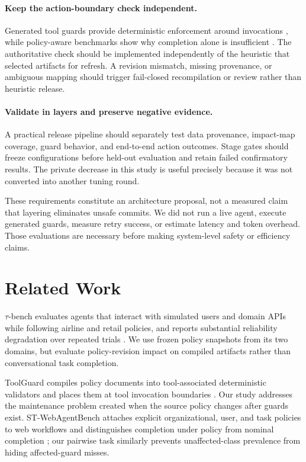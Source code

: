 \documentclass{article}
\begin{document}
\paragraph{Keep the action-boundary check independent.} Generated tool guards provide deterministic enforcement around invocations \cite{zwerdling2025toolguard}, while policy-aware benchmarks show why completion alone is insufficient \cite{levy2026stwebagentbench}. The authoritative check should be implemented independently of the heuristic that selected artifacts for refresh. A revision mismatch, missing provenance, or ambiguous mapping should trigger fail-closed recompilation or review rather than heuristic release.

\paragraph{Validate in layers and preserve negative evidence.} A practical release pipeline should separately test data provenance, impact-map coverage, guard behavior, and end-to-end action outcomes. Stage gates should freeze configurations before held-out evaluation and retain failed confirmatory results. The private decrease in this study is useful precisely because it was not converted into another tuning round.

These requirements constitute an architecture proposal, not a measured claim that layering eliminates unsafe commits. We did not run a live agent, execute generated guards, measure retry success, or estimate latency and token overhead. Those evaluations are necessary before making system-level safety or efficiency claims.

\section{Related Work}

$\tau$-bench evaluates agents that interact with simulated users and domain APIs while following airline and retail policies, and reports substantial reliability degradation over repeated trials \cite{yao2024taubench}. We use frozen policy snapshots from its two domains, but evaluate policy-revision impact on compiled artifacts rather than conversational task completion.

ToolGuard compiles policy documents into tool-associated deterministic validators and places them at tool invocation boundaries \cite{zwerdling2025toolguard}. Our study addresses the maintenance problem created when the source policy changes after guards exist. ST-WebAgentBench attaches explicit organizational, user, and task policies to web workflows and distinguishes completion under policy from nominal completion \cite{levy2026stwebagentbench}; our pairwise task similarly prevents unaffected-class prevalence from hiding affected-guard misses.
\end{document}
